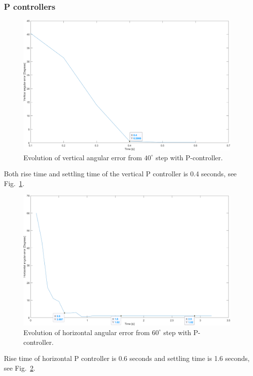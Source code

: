 \subsubsection{P controllers}
\label{sec:simon12}
\begin{figure}[h]
\centering
\includegraphics[width=\linewidth]{sections/assets/Vertical_P_controller.png}
\caption{Evolution of vertical angular error from \(40^{\circ}\) step with P-controller.}
\label{vert_P}
\end{figure}
Both rise time and settling time of the vertical P controller is 0.4 seconds, see Fig.~\ref{vert_P}.
\begin{figure}[h]
\centering
\includegraphics[width=\linewidth]{sections/assets/Horizontal_P_controller.png}
\caption{Evolution of horizontal angular error from \(60^{\circ}\) step with P-controller.}
\label{Horizontal_P}
\end{figure}
Rise time of horizontal P controller is 0.6 seconds and settling time is 1.6 seconds, see Fig.~\ref{Horizontal_P}.

